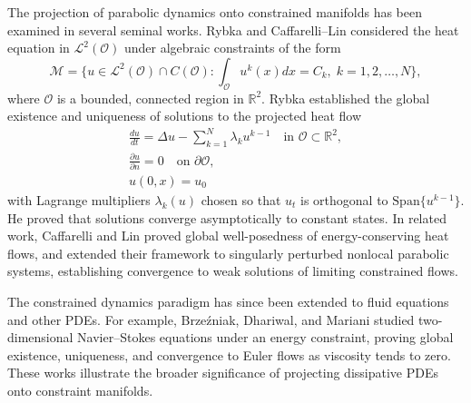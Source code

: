 \documentclass[10pt,a4paper]{amsart}
\numberwithin{equation}{section}
\begin{document}
The projection of parabolic dynamics onto constrained manifolds has been examined in
several seminal works. Rybka \cite{Rybka} and Caffarelli--Lin \cite{Cafe} considered
the heat equation in $\mathcal{L}^{2}(\mathcal{O})$ under algebraic constraints of the
form
\begin{equation*}
\mathcal{M} = \big\{ u \in \mathcal{L}^{2}(\mathcal{O}) \cap C(\mathcal{O})
: \int_{\mathcal{O}} u^{k}(x)  dx = C_{k},\;  k = 1, 2, \dots, N \big\},
\end{equation*}
where $\mathcal{O}$ is a bounded, connected region in $\mathbb{R}^{2}$.
Rybka established the global existence and uniqueness of solutions to the projected
heat flow
\begin{equation}
\begin{gathered}
\frac{d u}{d t} = \Delta u - \sum_{k=1}^{N} \lambda_{k} u^{k-1} \quad
 \text{in } \mathcal{O} \subset \mathbb{R}^{2}, \\
\frac{\partial u}{\partial n} = 0 \quad \text{on } \partial \mathcal{O}, \\
u(0,x) = u_{0}
\end{gathered} \label{eq1}
\end{equation}
with Lagrange multipliers $\lambda_{k}(u)$ chosen so that $u_{t}$ is orthogonal
to $\mathrm{Span}\{u^{k-1}\}$. He proved that solutions converge asymptotically to
constant states. In related work, Caffarelli and Lin \cite{Cafe} proved global
well-posedness of energy-conserving heat flows, and extended their framework to
singularly perturbed nonlocal parabolic systems, establishing convergence to weak
solutions of limiting constrained flows.

The constrained dynamics paradigm has since been extended to fluid equations and
other PDEs. For example, Brze\'zniak, Dhariwal, and Mariani \cite{Gaurav}
studied two-dimensional Navier--Stokes equations under an energy constraint,
proving global existence, uniqueness, and convergence to Euler flows as viscosity
tends to zero. These works illustrate the broader significance of projecting
dissipative PDEs onto constraint manifolds.
\end{document}

